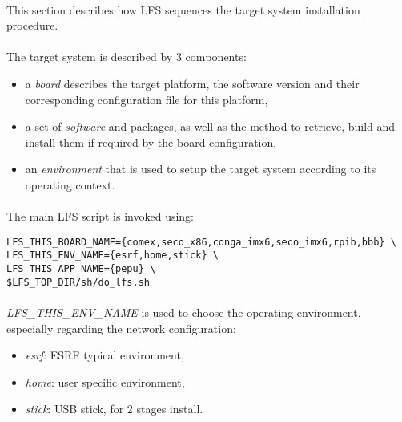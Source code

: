 \documentclass[a4paper, 11pt]{article}
\begin{document}
\paragraph{}
This section describes how LFS sequences the target system installation procedure.

\paragraph{}
The target system is described by 3 components:
\begin{itemize}
\item a \textit{board} describes the target platform, the software version and
their corresponding configuration file for this platform,
\item a set of \textit{software} and packages, as well as the method to retrieve,
build and install them if required by the board configuration,
\item an \textit{environment} that is used to setup the target system according
to its operating context.
\end{itemize}

\paragraph{}
The main LFS script is invoked using:\\

\begin{lstlisting}[frame=tb]
LFS_THIS_BOARD_NAME={comex,seco_x86,conga_imx6,seco_imx6,rpib,bbb} \
LFS_THIS_ENV_NAME={esrf,home,stick} \
LFS_THIS_APP_NAME={pepu} \
$LFS_TOP_DIR/sh/do_lfs.sh
\end{lstlisting}

\paragraph{}
\textit{LFS\_THIS\_ENV\_NAME} is used to choose the operating environment,
especially regarding the network configuration:
\begin{itemize}
\item \textit{esrf}: ESRF typical environment,
\item \textit{home}: user specific environment,
\item \textit{stick}: USB stick, for 2 stages install.
\end{itemize}
\end{document}

